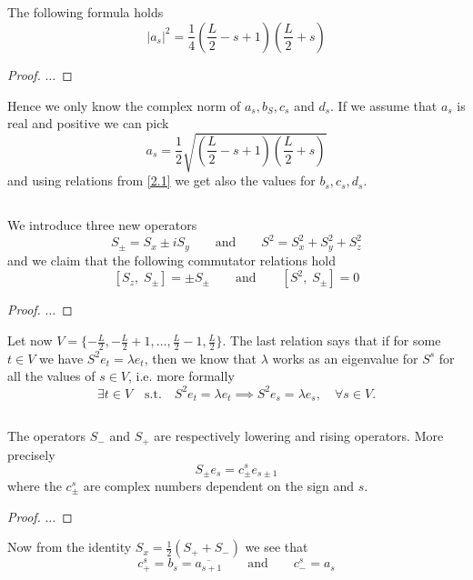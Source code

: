 \documentclass[]{article}
\newcommand{\AND}{\qquad \text{and} \qquad}
\newcommand{\sx}{S_x}
\newcommand{\sy}{S_y}
\newcommand{\sz}{S_z}
\begin{document}
\subsection{}
The following formula holds $$ |a_s|^2 = \frac{1}{4}(\frac{L}{2}-s+1)(\frac{L}{2}+s)$$
\begin{proof}
	$\dots$
\end{proof}

Hence we only know the complex norm of $a_s,b_S,c_s$ and $d_s$. If we assume that $a_s$ is real and positive we can pick
$$ a_s = \frac{1}{2} \sqrt{(\frac{L}{2}-s+1)(\frac{L}{2}+s)} $$ 
and using relations from \ref{2.1} we get also the values for $b_s,c_s,d_s$.

\subsection{}
We introduce three new operators
$$ S_{\pm} = \sx\pm i\sy \AND S^2 = \sx^2+\sy^2+\sz^2 $$
and we claim that the following commutator relations hold
$$ [\sz,\; S_{\pm}] = \pm S_{\pm} \AND [S^2,\; S_{\pm}] = 0 $$
\begin{proof}
	$\dots$
\end{proof}
Let now $V=\{-\frac{L}{2}, -\frac{L}{2}+1, \dots, \frac{L}{2}-1, \frac{L}{2}\}$. The last relation says that if for some $t\in V$ we have $S^2e_t = \lambda e_t$, then we know that $\lambda$ works as an eigenvalue for $S^s$ for all the values of $s\in V$, i.e. more formally 
\begin{equation}\label{ladder}
	\exists t\in V \quad \text{s.t.} \quad S^2e_t = \lambda e_t \implies S^2e_s = \lambda e_s, \quad \forall s\in V.
\end{equation}

\subsection{}
The operators $S_-$ and $S_+$ are respectively lowering and rising operators. More precisely $$ S_{\pm} e_s = c_{\pm}^s e_{s\pm1} $$ where the $c_{\pm}^s$ are complex numbers dependent on the sign and $s$.
\begin{proof}
	$\dots$
\end{proof}
Now from the identity $\sx = \frac{1}{2}(S_++S_-)$ we see that
\begin{equation}\label{eq1}
	c^s_{+} = b_s = \overline{a_{s+1}} \AND c^s_{-} = a_s
\end{equation}
\end{document}
